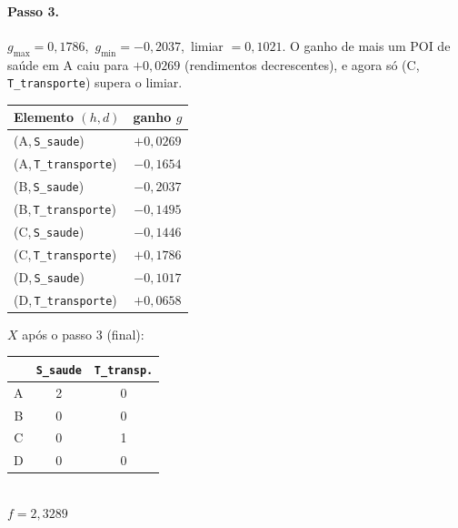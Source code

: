 \documentclass[11pt,a4paper]{article}
\newcommand{\hex}[1]{\textsf{#1}}
\begin{document}
\paragraph{Passo 3.}
$g_{\max}=0{,}1786$,\ $g_{\min}=-0{,}2037$,\ limiar $=0{,}1021$.
O ganho de mais um POI de saúde em \hex{A} caiu para $+0{,}0269$ (rendimentos
decrescentes), e agora só (\hex{C},\,\texttt{T\_transporte}) supera o limiar.

\begin{minipage}[t]{0.55\textwidth}
\centering
\small
\begin{tabular}{@{}lc@{}}
\toprule
Elemento $(h,d)$ & ganho $g$ \\
\midrule
(\hex{A},\,\texttt{S\_saude})                        & $+0{,}0269$ \\
(\hex{A},\,\texttt{T\_transporte})                   & $-0{,}1654$ \\
(\hex{B},\,\texttt{S\_saude})                        & $-0{,}2037$ \\
(\hex{B},\,\texttt{T\_transporte})                   & $-0{,}1495$ \\
(\hex{C},\,\texttt{S\_saude})                        & $-0{,}1446$ \\
\rowcolor{cellsel}(\hex{C},\,\texttt{T\_transporte}) & $+0{,}1786$ \\
(\hex{D},\,\texttt{S\_saude})                        & $-0{,}1017$ \\
(\hex{D},\,\texttt{T\_transporte})                   & $+0{,}0658$ \\
\bottomrule
\end{tabular}
\end{minipage}
\hfill
\begin{minipage}[t]{0.40\textwidth}
\centering
\small
\vspace{2pt}
$X$ após o passo 3 (final):\\[4pt]
\begin{tabular}{@{}c cc@{}}
\toprule
 & \texttt{S\_saude} & \texttt{T\_transp.} \\
\midrule
\hex{A} & 2 & 0 \\
\hex{B} & 0 & 0 \\
\hex{C} & 0 & \cellcolor{cellchg}1 \\
\hex{D} & 0 & 0 \\
\bottomrule
\end{tabular}\\[4pt]
$f = 2{,}3289$
\end{minipage}
\end{document}
